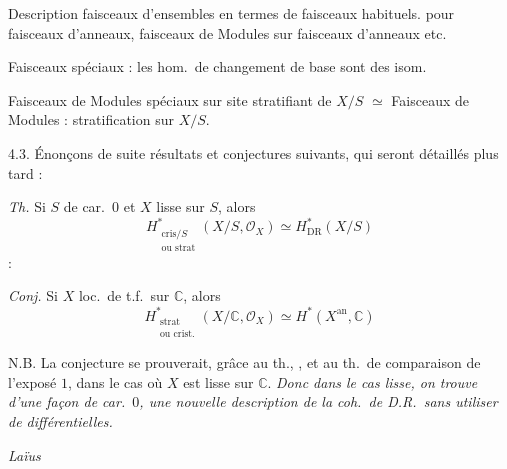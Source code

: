 \documentclass[11pt,a4paper]{article}
\begin{document}
Description  \ill{} faisceaux d'ensembles en termes de
faisceaux habituels.  pour faisceaux d'anneaux, faisceaux
de Modules sur faisceaux d'anneaux etc.

Faisceaux spéciaux : les hom.\ de changement de base sont des isom.

Faisceaux de Modules spéciaux sur site stratifiant de $X/S$
$\simeq$
Faisceaux de Modules : stratification sur $X/S$.

4.3. Énonçons de suite  résultats et conjectures suivants,
qui seront  détaillés plus tard :

\emph{Th.} Si $S$ de car.\ $0$ et $X$ lisse sur $S$, alors
\[
  H^{*}_{\substack{\text{cris}/S \\ \text{ou strat}}}(X/S, \mathcal{O}_X)
  \simeq H^{*}_{\mathrm{DR}}(X/S)
\]
  :



\emph{Conj.} Si $X$ loc.\ de t.f.\ sur $\mathbb{C}$, alors
\[
  H^{*}_{\substack{\text{strat} \\ \text{ou crist.}}}(X/\mathbb{C},
  \mathcal{O}_X) \simeq H^{*}(X^{\mathrm{an}}, \mathbb{C})
\]

N.B. La conjecture se prouverait, grâce au th., , et au
th.\ de comparaison de l'exposé $1$, dans le cas où $X$ est lisse sur
$\mathbb{C}$. \emph{Donc dans le cas lisse, on trouve d'une façon de
car.\ $0$, une nouvelle description de la coh.\ de D.R.\ sans utiliser
de différentielles.}



\emph{Laïus}
\end{document}
